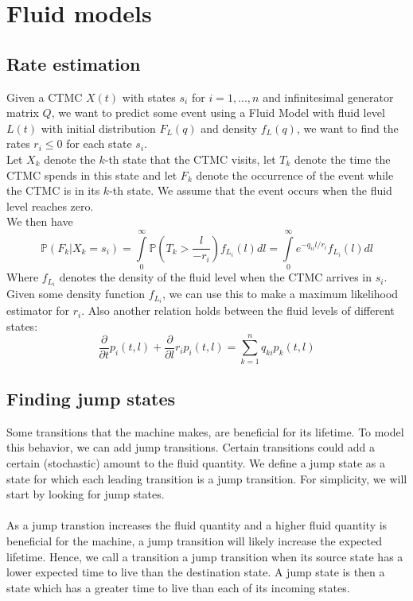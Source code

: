 \section{Fluid models}

\subsection{Rate estimation}
Given a CTMC $X(t)$ with states $s_i$ for $i=1,...,n$ and infinitesimal generator matrix $Q$, we want to predict some event using a Fluid Model with fluid level $L(t)$ with initial distribution $F_L(q)$ and density $f_L(q)$, we want to find the rates $r_i\leq 0$ for each state $s_i$.\\
Let $X_k$ denote the $k$-th state that the CTMC visits, let $T_k$ denote the time the CTMC spends in this state and let $F_k$ denote the occurrence of the event while the CTMC is in its $k$-th state. We assume that the event occurs when the fluid level reaches zero.\\
We then have
$$
\mathbb{P}(F_k|X_k=s_i)=\int\limits_0^{\infty}\mathbb{P}(T_k>\frac{l}{-r_i})f_{L_i}(l)dl=\int\limits_0^{\infty}e^{-q_{ii}l/r_i}f_{L_i}(l)dl
$$
Where $f_{L_i}$ denotes the density of the fluid level when the CTMC arrives in $s_i$.\\
Given some density function $f_{L_i}$, we can use this to make a maximum likelihood estimator for $r_i$.
Also another relation holds between the fluid levels of different states\citep{Gribaudo2007}:
$$
\frac{\partial}{\partial t}p_i(t,l)+\frac{\partial}{\partial l}r_ip_i(t,l)=\sum\limits_{k=1}^nq_{ki}p_k(t,l)
$$
\subsection{Finding jump states}
Some transitions that the machine makes, are beneficial for its lifetime. To model this behavior, we can add jump transitions. Certain transitions could add a certain (stochastic) amount to the fluid quantity. We define a jump state as a state for which each leading transition is a jump transition. For simplicity, we will start by looking for jump states.\\
\\

As a jump transtion increases the fluid quantity and a higher fluid quantity is beneficial for the machine, a jump transition will likely increase the expected lifetime. Hence, we call a transition a jump transition when its source state has a lower expected time to live than the destination state. A jump state is then a state which has a greater time to live than each of its incoming states.\\
\\


